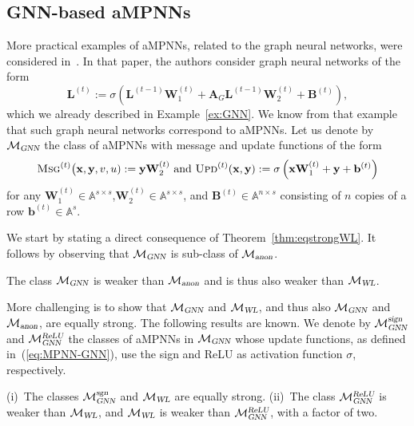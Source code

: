 \subsection{GNN-based aMPNNs}
More practical examples of aMPNNs, related to the graph neural networks, were considered in~\cite{grohewl}.
In that paper, the authors consider graph neural networks of the form
$$
\mathbf{L}^{(t)}:=\sigma\left(\mathbf{L}^{(t-1)}\mathbf{W}_1^{(t)}+\mathbf{A}_G\mathbf{L}^{(t-1)}\mathbf{W}_2^{(t)}+\mathbf{B}^{(t)}\right), $$
which we already described in Example~\ref{ex:GNN}. We know from that example that such graph neural networks correspond to aMPNNs.
Let us denote by $\mathcal{M}_{\textsl{GNN}}$ the class of aMPNNs with message and update functions of the form
\begin{equation}\textsc{Msg}^{(t)}\bigl(\mathbf{x},\mathbf{y},v,u):=\mathbf{y}\mathbf{W}_2^{(t)}
\text{ and } 
\textsc{Upd}^{(t)}(\mathbf{x},\mathbf{y}):=\sigma\left(\mathbf{x}\mathbf{W}_1^{(t)}+\mathbf{y} + \mathbf{b}^{(t)}\right) \label{eq:MPNN-GNN}
\end{equation}
for any $\mathbf{W}_1^{(t)}\in\mathbb{A}^{s\times s}$,$\mathbf{W}_2^{(t)}\in\mathbb{A}^{s\times s}$, and $\mathbf{B}^{(t)}\in\mathbb{A}^{n\times s}$ consisting of $n$ copies of a row $\mathbf{b}^{(t)}\in\mathbb{A}^{s}$. 

We start by stating a direct consequence of Theorem~\ref{thm:eqstrongWL}. It follows by observing
that $\mathcal{M}_{\textsl{GNN}}$ is sub-class of 
$\mathcal{M}_{\textsl{anon}}$.
\begin{corollary}
	The class 
$\mathcal{M}_{\textsl{GNN}}$ is weaker than $\mathcal{M}_{\textsl{anon}}$ and is thus also weaker than $\mathcal{M}_{\textsl{WL}}$.
\end{corollary}

More challenging is to show that $\mathcal{M}_{\textsl{GNN}}$ and $\mathcal{M}_{\textsl{WL}}$, and thus also $\mathcal{M}_{\textsl{GNN}}$ and $\mathcal{M}_{\textsl{anon}}$, are equally strong. The following results are known. We denote
by $\mathcal{M}_{\textsl{GNN}}^{\textsl{sign}}$
and $\mathcal{M}_{\textsl{GNN}}^{\textsl{ReLU}}$ the classes of  aMPNNs in $\mathcal{M}_{\textsl{GNN}}$ whose update functions, as defined in~(\ref{eq:MPNN-GNN}), use the sign and ReLU as activation function $\sigma$, respectively.

\begin{theorem} \label{thm:grohe_lower}
(i)~The classes $\mathcal{M}_{\textsl{GNN}}^{\textsl{sgn}}$ and  $\mathcal{M}_{\textsl{WL}}$ are equally strong. (ii)~The class 
$\mathcal{M}_{\textsl{GNN}}^{\textsl{ReLU}}$ is weaker than $\mathcal{M}_{\textsl{WL}}$, and
$\mathcal{M}_{\textsl{WL}}$ is weaker than $\mathcal{M}_{\textsl{GNN}}^{\textsl{ReLU}}$, with a factor of two.
\end{theorem}

